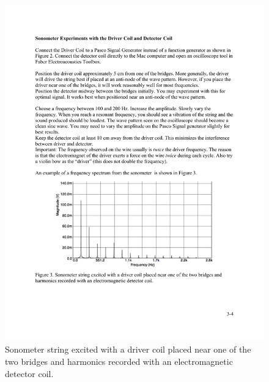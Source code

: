 \documentclass[11pt]{NSF}
\begin{document}
%
%
\begin{figure}[hbtp] 
\begin{center} 
\includegraphics[width=.8\textwidth]{fig3_3}
\caption{Sonometer string excited with a driver coil placed near one of the 
two bridges and harmonics recorded with an electromagnetic detector coil.}
\label{f:3} 
\end{center} 
\end{figure}
%
%
\end{document}

